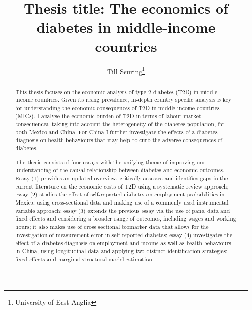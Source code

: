 \documentclass[12pt]{article}
\title{Thesis title: The economics of diabetes in middle-income countries}
\author{Till Seuring\footnote{University of East Anglia}}
\date{\vspace{-5ex}}
\begin{document}
\maketitle

\begin{abstract}
This thesis focuses on the economic analysis of type 2 diabetes (T2D) in middle-income countries. Given its rising prevalence, in-depth country specific analysis is key for understanding the economic consequences of T2D in middle-income countries (MICs). I analyse the economic burden of T2D in terms of labour market consequences, taking into account the heterogeneity of the diabetes population, for both Mexico and China. For China I further investigate the effects of a diabetes diagnosis on health behaviours that may help to curb the adverse consequences of diabetes.

The thesis consists of four essays with the unifying theme of improving our understanding of the causal relationship between diabetes and economic outcomes. Essay (1) provides an updated overview, critically assesses and identifies gaps in the current literature on the economic costs of T2D using a systematic review approach; essay (2) studies the effect of self-reported diabetes on employment probabilities in Mexico, using cross-sectional data and making use of a commonly used instrumental variable approach; essay (3) extends the previous essay via the use of panel data and fixed effects and considering a broader range of outcomes, including wages and working hours; it also makes use of cross-sectional biomarker data that allows for the investigation of measurement error in self-reported diabetes; essay (4) investigates the effect of a diabetes diagnosis on employment and income as well as health behaviours in China, using longitudinal data and applying two distinct identification strategies: fixed effects and marginal structural model estimation.


\end{abstract}
\end{document}
